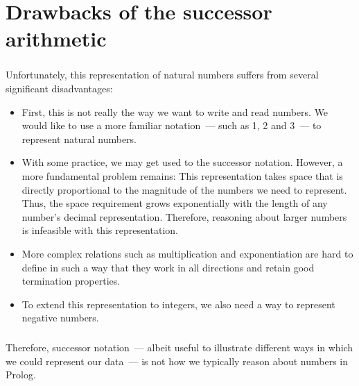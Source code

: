 \section{Drawbacks of the successor arithmetic}



\begin{frame}[shrink=4]
	\frametitle{\insertsection}
	
	Unfortunately, this representation of natural numbers suffers from several significant disadvantages:
	\begin{itemize}
		\item First, this is not really the way we want to write and read numbers. We would like to use a more familiar notation~--- such as 1, 2 and 3~--- to represent natural numbers.
		\item With some practice, we may get used to the successor notation. However, a more fundamental problem remains: This representation takes space that is directly proportional to the magnitude of the numbers we need to represent. Thus, the space requirement grows exponentially with the length of any number's decimal representation. Therefore, reasoning about larger numbers is infeasible with this representation.
		\item More complex relations such as multiplication and exponentiation are hard to define in such a way that they work in all directions and retain good termination properties.
		\item To extend this representation to integers, we also need a way to represent negative numbers.
	\end{itemize}
	
\end{frame}


\begin{frame}
	\frametitle{\insertsection}
	\justifying
	Therefore, successor notation~--- albeit useful to illustrate different ways in which we could represent our data~--- is not how we typically reason about numbers in Prolog.
\end{frame}


